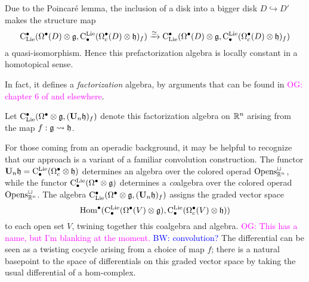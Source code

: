 \documentclass[11pt]{amsart}
\numberwithin{equation}{section}
\def\brian{\textcolor{blue}{BW: }\textcolor{blue}}
\def\owen{\textcolor{magenta}{OG: }\textcolor{magenta}}
\begin{document}
Due to the Poincar\'e lemma, the inclusion of a disk into a bigger disk $D \hookrightarrow D'$ makes the structure map 
\[
{\rm C}_{\rm Lie}^\bullet(\Omega^\bullet(D) \otimes \mathfrak g, {\rm C}^{\rm Lie}_\bullet(\Omega^\bullet_c(D) \otimes \mathfrak h)_f) \xrightarrow{\simeq} {\rm C}_{\rm Lie}^\bullet(\Omega^\bullet(D) \otimes \mathfrak g, {\rm C}^{\rm Lie}_\bullet(\Omega^\bullet_c(D) \otimes \mathfrak h)_f)
\]
a quasi-isomorphism.
Hence this prefactorization algebra is locally constant in a homotopical sense.

In fact, it defines a {\em factorization} algebra, by arguments that can be found in \owen{chapter 6 of \cite{CG1} and elsewhere}.

\begin{dfn}
\label{dfn: centralizer for f}
Let ${\rm C}_{\rm Lie}^\bullet(\Omega^\bullet \otimes \mathfrak g, (\mathbf U_n \mathfrak h)_f)$ denote this factorization algebra on $\mathbb R^n$ arising from the map $f: \mathfrak g \rightsquigarrow \mathfrak h$.
\end{dfn}

\begin{rmk}
For those coming from an operadic background, it may be helpful to recognize that our approach is a variant of a familiar convolution construction.
The functor $\mathbf U_n \mathfrak h = {\rm C}^{\rm Lie}_\bullet(\Omega^\bullet_c \otimes \mathfrak h)$ determines an algebra over the colored operad ${\rm Opens}_{\mathbb R^n}^\sqcup$,
while the functor ${\rm C}^{\rm Lie}_\bullet(\Omega^\bullet \otimes \mathfrak g)$ determines a {\em co}\/algebra over the colored operad ${\rm Opens}_{\mathbb R^n}^\sqcup$.
The algebra ${\rm C}_{\rm Lie}^\bullet(\Omega^\bullet \otimes \mathfrak g, (\mathbf U_n \mathfrak h)_f)$ assigns the graded vector space
\[
{\rm Hom}^\bullet({\rm C}^{\rm Lie}_\bullet(\Omega^\bullet(V) \otimes \mathfrak g), {\rm C}^{\rm Lie}_\bullet(\Omega^\bullet_c(V) \otimes \mathfrak h))
\] 
to each open set $V$,
twining together this coalgebra and algebra.
\owen{This has a name, but I'm blanking at the moment.}
\brian{convolution?}
The differential can be seen as a twisting cocycle arising from a choice of map $f$;
there is a natural basepoint to the space of differentials on this graded vector space by taking the usual differential of a hom-complex.
\end{rmk}

%
%
%
%
\end{document}
